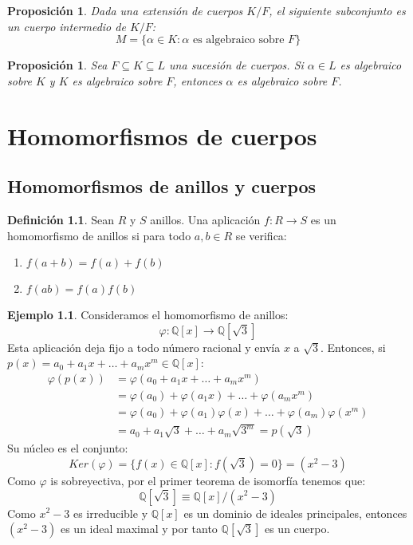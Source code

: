 \documentclass{report}
\newtheorem{proposition}[theorem]{Proposición}
\theoremstyle{remark}
\theoremstyle{definition}
\newtheorem{definition}{Definición}[chapter]
\theoremstyle{definition}
\theoremstyle{definition}
\newtheorem*{example}{Ejemplo}
\begin{document}
\begin{proposition}
    Dada una extensión de cuerpos $K/F$, el siguiente subconjunto es un cuerpo intermedio de $K/F$:
    $$M = \{ \alpha \in K : \alpha \text{ es algebraico sobre } F \}$$
\end{proposition}

\begin{proposition}
    Sea $F \subseteq K \subseteq L$ una sucesión de cuerpos. Si $\alpha \in L$ es algebraico sobre $K$ y $K$ es algebraico sobre $F$, entonces $\alpha$ es algebraico sobre $F$.
\end{proposition}

\chapter{Homomorfismos de cuerpos}
\section{Homomorfismos de anillos y cuerpos}

\begin{definition}
    Sean $R$ y $S$ anillos. Una aplicación $f : R \to S$ es un homomorfismo de anillos si para todo $a, b \in R$ se verifica:
    \begin{enumerate}
        \item $f(a + b) = f(a) + f(b)$
        \item $f(ab) = f(a) f(b)$
    \end{enumerate}
\end{definition}

\begin{example}
    Consideramos el homomorfismo de anillos:
    $$\varphi : \mathbb{Q}[x] \to \mathbb{Q}[\sqrt{3}]$$
    Esta aplicación deja fijo a todo número racional y envía $x$ a $\sqrt{3}$.
    Entonces, si $p(x) = a_0 + a_1x + \dots + a_mx^m \in \mathbb{Q}[x]$:
    \begin{align*}
        \varphi(p(x)) & = \varphi(a_0 + a_1x + \dots + a_mx^m)                                     \\
                      & = \varphi(a_0) + \varphi(a_1x) + \dots + \varphi(a_mx^m)                   \\
                      & = \varphi(a_0) + \varphi(a_1)\varphi(x) + \dots + \varphi(a_m)\varphi(x^m) \\
                      & = a_0 + a_1\sqrt{3} + \dots + a_m\sqrt{3^m} = p(\sqrt{3})
    \end{align*}
    Su núcleo es el conjunto:
    $$Ker(\varphi) = \{ f(x) \in \mathbb{Q}[x] : f(\sqrt{3}) = 0 \} = (x^2 - 3)$$
    Como $\varphi$ is sobreyectiva, por el primer teorema de isomorfía tenemos que:
    $$\mathbb{Q}[\sqrt{3}] \equiv \mathbb{Q}[x] / (x^2 - 3)$$
    Como $x^2 - 3$ es irreducible y $\mathbb{Q}[x]$ es un dominio de ideales principales, entonces $(x^2 - 3)$ es un ideal maximal y por tanto $\mathbb{Q}[\sqrt{3}]$ es un cuerpo.
\end{example}
\end{document}
